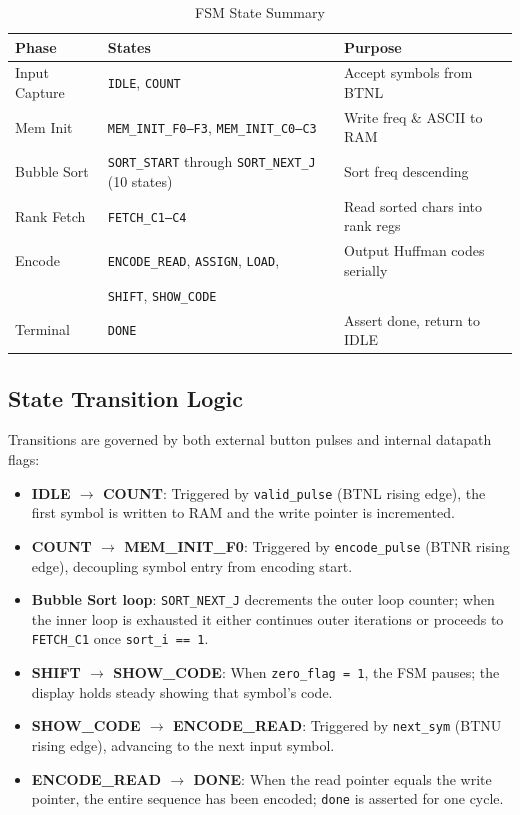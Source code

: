 \documentclass[12pt,a4paper]{article}
\begin{document}
\begin{table}[H]
\centering
\caption{FSM State Summary}
\begin{tabular}{lll}
\toprule
\textbf{Phase} & \textbf{States} & \textbf{Purpose} \\
\midrule
Input Capture   & \texttt{IDLE}, \texttt{COUNT}                                 & Accept symbols from BTNL        \\
Mem Init        & \texttt{MEM\_INIT\_F0--F3}, \texttt{MEM\_INIT\_C0--C3}        & Write freq \& ASCII to RAM      \\
Bubble Sort     & \texttt{SORT\_START} through \texttt{SORT\_NEXT\_J} (10 states) & Sort freq descending           \\
Rank Fetch      & \texttt{FETCH\_C1--C4}                                        & Read sorted chars into rank regs\\
Encode          & \texttt{ENCODE\_READ}, \texttt{ASSIGN}, \texttt{LOAD},        & Output Huffman codes serially   \\
                & \texttt{SHIFT}, \texttt{SHOW\_CODE}                           &                                 \\
Terminal        & \texttt{DONE}                                                 & Assert done, return to IDLE     \\
\bottomrule
\end{tabular}
\end{table}

\subsection{State Transition Logic}
Transitions are governed by both external button pulses and internal datapath flags:

\begin{itemize}
  \item \textbf{IDLE $\to$ COUNT}: Triggered by \texttt{valid\_pulse} (BTNL rising edge),
        the first symbol is written to RAM and the write pointer is incremented.
  \item \textbf{COUNT $\to$ MEM\_INIT\_F0}: Triggered by \texttt{encode\_pulse}
        (BTNR rising edge), decoupling symbol entry from encoding start.
  \item \textbf{Bubble Sort loop}: \texttt{SORT\_NEXT\_J} decrements the outer loop
        counter; when the inner loop is exhausted it either continues outer
        iterations or proceeds to \texttt{FETCH\_C1} once \texttt{sort\_i == 1}.
  \item \textbf{SHIFT $\to$ SHOW\_CODE}: When \texttt{zero\_flag = 1}, the FSM pauses;
        the display holds steady showing that symbol's code.
  \item \textbf{SHOW\_CODE $\to$ ENCODE\_READ}: Triggered by \texttt{next\_sym}
        (BTNU rising edge), advancing to the next input symbol.
  \item \textbf{ENCODE\_READ $\to$ DONE}: When the read pointer equals the write pointer,
        the entire sequence has been encoded; \texttt{done} is asserted for one cycle.
\end{itemize}
\end{document}
